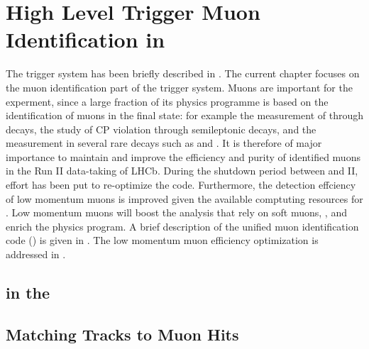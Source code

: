 \chapter{High Level Trigger Muon Identification in \runtwo}
\label{Muon_id_hlt}

The \lhcb trigger system has been briefly described in . The current chapter focuses on the muon identification
part of the trigger system. Muons are important for the \lhcb experment, since a large fraction of its physics programme is based on
the identification of muons in the final state: for example the measurement of \phis through \BsJpsiPhi decays, the study of CP
violation through semileptonic decays, and the measurement
in several rare decays such as \BdKstmumu and \Bsmm. It is therefore of major importance to maintain and improve the efficiency
and purity of identified muons in the Run II data-taking of LHCb. During the shutdown period between \runone and II, effort has
been put to re-optimize the \muonID code. Furthermore, the detection effciency of low momentum muons is improved given the available
comptuting resources for \runtwo. Low momentum muons will boost the analysis that rely on soft muons, ,
and enrich the \lhcb physics program. A brief description of the unified muon identification code (\muonID) is given in .
The low momentum muon efficiency optimization is addressed in .

\section{\hltone \muonID in the \lhc \runtwo}
\label{muid_hlt1}


\section{Matching \velo Tracks to Muon Hits}
\label{mvm_algorrithm}

